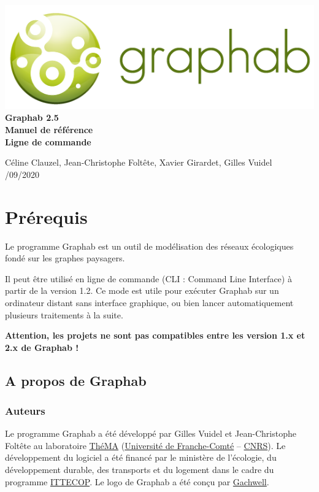 \documentclass[a4paper,10pt]{report}
\begin{document}
 \begin{titlepage}
 	
 	\centering
 	\includegraphics[scale=0.5]{img/logo.png}\\
 	
 	\bigskip
 	\bigskip
 	\bigskip	
 	{\Huge
 		\bfseries
 		Graphab 2.5\\
 		\bigskip
 		Manuel de référence\\
 		Ligne de commande\\
 	}
 	\bigskip
 	\bigskip
 	\bigskip
 	\bigskip
 	\bigskip
 	
 	{\Large		
 		Céline Clauzel, Jean-Christophe Foltête, Xavier Girardet, Gilles Vuidel\\
 		/09/2020\\
 	}
 	
 \end{titlepage}




\tableofcontents

\chapter{Prérequis}

Le programme Graphab est un outil de modélisation des réseaux écologiques fondé sur les graphes paysagers.

Il peut être utilisé en ligne de commande (CLI : Command Line Interface) à partir de la version 1.2. Ce mode est utile pour exécuter Graphab sur un ordinateur distant sans interface graphique, ou bien lancer automatiquement plusieurs traitements à la suite.

\textbf{Attention, les projets ne sont pas compatibles entre les version 1.x et 2.x de Graphab !}

\section{A propos de Graphab}

\subsection{Auteurs}
Le programme Graphab a été développé par Gilles Vuidel et Jean-Christophe Foltête au laboratoire \href{http://thema.univ-fcomte.fr}{ThéMA} (\href{http://www.univ-fcomte.fr}{Université de Franche-Comté} – \href{http://www.cnrs.fr}{CNRS}). Le développement du logiciel a été financé par le ministère de l'écologie, du développement durable, des transports et du logement dans le cadre du programme \href{http://www.ittecop.fr/}{ITTECOP}. Le logo de Graphab a été conçu par \href{http://www.gachwell.com/}{Gachwell}. 
\end{document}
